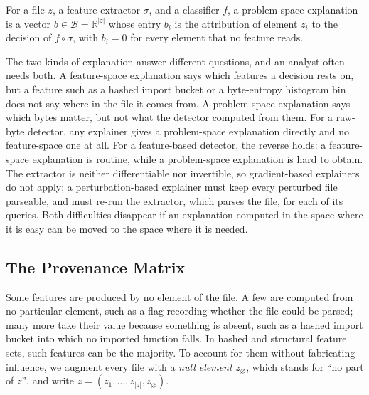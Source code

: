 \label{def:ProblemSpaceExplanation}
{
For a file $z$, a feature extractor $\sigma$, and a classifier $f$, a problem-space explanation is a vector
$b \in \mathcal{B} = \mathbb{R}^{|z|}$ whose entry $b_i$ is the attribution of element $z_i$ to the decision of
$f \circ \sigma$, with $b_i = 0$ for every element that no feature reads.
}



The two kinds of explanation answer different questions, and an analyst often needs both. A feature-space explanation
says which features a decision rests on, but a feature such as a hashed import bucket or a byte-entropy histogram bin
does not say where in the file it comes from. A problem-space explanation says which bytes matter, but not what the
detector computed from them. For a raw-byte detector, any explainer gives a problem-space explanation directly and no
feature-space one at all. For a feature-based detector, the reverse holds: a feature-space explanation is routine,
while a problem-space explanation is hard to obtain. The extractor is neither differentiable nor invertible,
so gradient-based explainers do not apply; a perturbation-based explainer must keep every perturbed file parseable, and
must re-run the extractor, which parses the file, for each of its queries. Both difficulties disappear if an
explanation computed in the space where it is easy can be moved to the space where it is needed.

\subsection{The Provenance Matrix}
\label{sec:XML:ProvenanceMatrix}

Some features are produced by no element of the file. A few are computed from no particular element, such as a flag
recording whether the file could be parsed; many more take their value because something is absent, such as a hashed
import bucket into which no imported function falls. In hashed and structural feature sets, such features can be the
majority. To account for them without fabricating influence, we augment every file with a \emph{null element}
$z_\varnothing$, which stands for ``no part of $z$'', and write $\bar{z} = (z_1, \dots, z_{|z|}, z_\varnothing)$.

